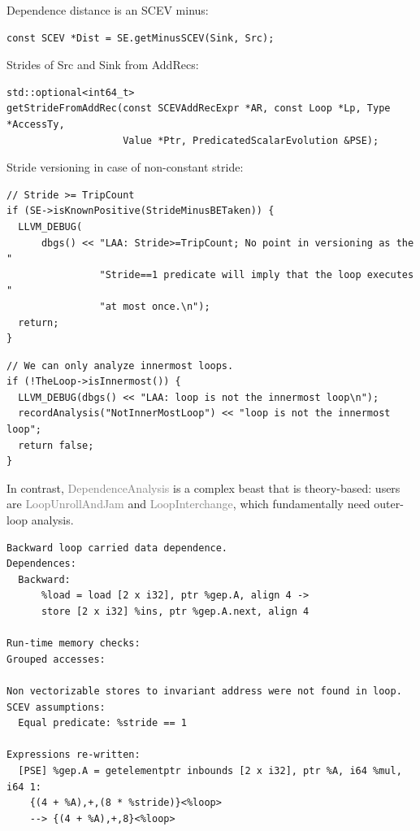 \documentclass{beamer}
\begin{document}
\begin{frame}[containsverbatim]
  Dependence distance is an SCEV minus:
  \begin{verbatim}
const SCEV *Dist = SE.getMinusSCEV(Sink, Src);
  \end{verbatim}
  \vspace{2em}
  Strides of Src and Sink from AddRecs:
  \begin{verbatim}
std::optional<int64_t>
getStrideFromAddRec(const SCEVAddRecExpr *AR, const Loop *Lp, Type *AccessTy,
                    Value *Ptr, PredicatedScalarEvolution &PSE);
  \end{verbatim}
  \vspace{2em}
  Stride versioning in case of non-constant stride:
  \begin{verbatim}
// Stride >= TripCount
if (SE->isKnownPositive(StrideMinusBETaken)) {
  LLVM_DEBUG(
      dbgs() << "LAA: Stride>=TripCount; No point in versioning as the "
                "Stride==1 predicate will imply that the loop executes "
                "at most once.\n");
  return;
}
  \end{verbatim}
\end{frame}

\begin{frame}[containsverbatim]
  \begin{verbatim}
// We can only analyze innermost loops.
if (!TheLoop->isInnermost()) {
  LLVM_DEBUG(dbgs() << "LAA: loop is not the innermost loop\n");
  recordAnalysis("NotInnerMostLoop") << "loop is not the innermost loop";
  return false;
}
\end{verbatim}

  \vspace{1em}

  In contrast, \textcolor{gray}{DependenceAnalysis} is a complex beast that is theory-based: users are \textcolor{gray}{LoopUnrollAndJam} and \textcolor{gray}{LoopInterchange}, which fundamentally need outer-loop analysis.
\end{frame}

\begin{frame}[containsverbatim]
  \begin{adjustwidth}{-1em}{-1em}
    \begin{verbatim}
Backward loop carried data dependence.
Dependences:
  Backward:
      %load = load [2 x i32], ptr %gep.A, align 4 ->
      store [2 x i32] %ins, ptr %gep.A.next, align 4

Run-time memory checks:
Grouped accesses:

Non vectorizable stores to invariant address were not found in loop.
SCEV assumptions:
  Equal predicate: %stride == 1

Expressions re-written:
  [PSE] %gep.A = getelementptr inbounds [2 x i32], ptr %A, i64 %mul, i64 1:
    {(4 + %A),+,(8 * %stride)}<%loop>
    --> {(4 + %A),+,8}<%loop>
    \end{verbatim}
  \end{adjustwidth}
\end{frame}
\end{document}
